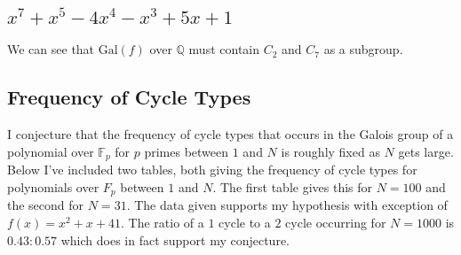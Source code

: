 \documentclass{article}
\begin{document}
\subsection{$ x^7 + x^5 - 4x^4 - x^3 + 5x + 1$  }
We can see that $\text{Gal} (f)$ over $\mathbb{Q}$ must contain $C_2$ and $C_7$ as a subgroup.

\newpage
\subsection{Frequency of Cycle Types}

I conjecture that the frequency of cycle types that occurs in the Galois group of a polynomial over $\mathbb{F}_p$ for $p$ primes between $1$ and $N$ is roughly fixed as $N$ gets large.  Below I've included two tables,  both giving the frequency of cycle types for polynomials over $F_p$ between $1$ and $N$.  The first table gives this for $N=100$ and the second for $N=31$.  The data given supports my hypothesis with exception of $f(x)=x^2+x+41$.  The ratio of a $1$ cycle to a $2$ cycle occurring for $N=1000$ is $0.43:0.57$ which does in fact support my conjecture.
\end{document}
